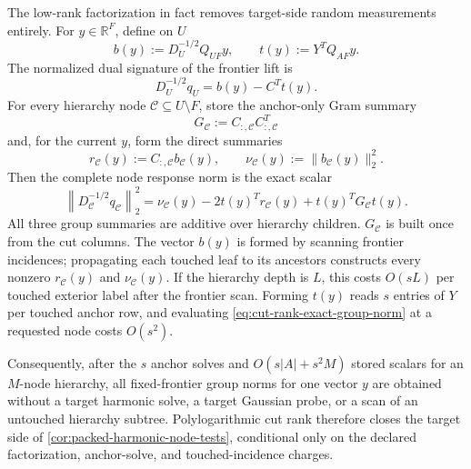 \begin{theorem}
The low-rank factorization in fact removes target-side random measurements
entirely.  For $y\in\mathbb R^F$, define on $U$
\begin{equation*}
 b(y):=D_U^{-1/2}Q_{UF}y,
 \qquad
 t(y):=Y^TQ_{AF}y.
\end{equation*}
The normalized dual signature of the frontier lift is
\begin{equation}
 D_U^{-1/2}q_U=b(y)-C^Tt(y).
 \label{eq:cut-rank-dual-decomposition}
\end{equation}
For every hierarchy node $\mathcal C\subseteq U\setminus F$, store the
anchor-only Gram summary
\begin{equation}
 G_{\mathcal C}:=C_{:,\mathcal C}C_{:,\mathcal C}^T
 \label{eq:cut-rank-group-gram}
\end{equation}
and, for the current $y$, form the direct summaries
\begin{equation}
 r_{\mathcal C}(y):=C_{:,\mathcal C}b_{\mathcal C}(y),
 \qquad
 \nu_{\mathcal C}(y):=\|b_{\mathcal C}(y)\|_2^2.
 \label{eq:cut-rank-direct-summaries}
\end{equation}
Then the complete node response norm is the exact scalar
\begin{equation}
 \left\|D_{\mathcal C}^{-1/2}q_{\mathcal C}\right\|_2^2
 =\nu_{\mathcal C}(y)
  -2t(y)^Tr_{\mathcal C}(y)
  +t(y)^TG_{\mathcal C}t(y).
 \label{eq:cut-rank-exact-group-norm}
\end{equation}
All three group summaries are additive over hierarchy children.
$G_{\mathcal C}$ is built once from the cut columns.  The vector $b(y)$ is
formed by scanning frontier incidences; propagating each touched leaf to its
ancestors constructs every nonzero $r_{\mathcal C}(y)$ and
$\nu_{\mathcal C}(y)$.  If the hierarchy depth is $L$, this costs
$O(sL)$ per touched exterior label after the frontier scan.  Forming $t(y)$
reads $s$ entries of $Y$ per touched anchor row, and evaluating
\cref{eq:cut-rank-exact-group-norm} at a requested node costs $O(s^2)$.

Consequently, after the $s$ anchor solves and
$O(s|A|+s^2M)$ stored scalars for an $M$-node hierarchy, all fixed-frontier
group norms for one vector $y$ are obtained without a target harmonic solve,
a target Gaussian probe, or a scan of an untouched hierarchy subtree.
Polylogarithmic cut rank therefore closes the target side of
\cref{cor:packed-harmonic-node-tests}, conditional only on the declared
factorization, anchor-solve, and touched-incidence charges.


\end{theorem}
